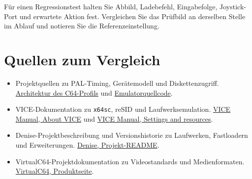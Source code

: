 \documentclass[fontsize=10.2bp,DIV=calc,oneside,open=any,headings=normal,numbers=noenddot]{scrbook}
\begin{document}
Für einen Regressionstest halten Sie Abbild, Ladebefehl, Eingabefolge,
Joystick-Port und erwartete Aktion fest. Vergleichen Sie das Prüfbild
an derselben Stelle im Ablauf und notieren Sie die Referenzeinstellung.

\section{Quellen zum Vergleich}\label{sec:comparison-sources}
\begin{itemize}
  \item Projektquellen zu PAL-Timing, Gerätemodell und Diskettenzugriff.
    \href{https://github.com/rudolfstepan/6502-sbc-emulator/blob/d86f6b0/docs/ARCHITECTURE.md#c64-profile}{Architektur des C64-Profils}
    und
    \href{https://github.com/rudolfstepan/6502-sbc-emulator/tree/d86f6b0/src}{Emulatorquellcode}.
  \item VICE-Dokumentation zu \texttt{x64sc}, reSID und
    Laufwerksemulation.
    \href{https://vice-emu.sourceforge.io/vice_1.html}{VICE Manual, About VICE}
    und
    \href{https://vice-emu.sourceforge.io/vice_6.html}{VICE Manual, Settings and resources}.
  \item Denise-Projektbeschreibung und Versionshistorie zu
    Laufwerken, Fastloadern und Erweiterungen.
    \href{https://github.com/piciji/denise}{Denise, Projekt-README}.
  \item VirtualC64-Projektdokumentation zu Videostandards und
    Medienformaten.
    \href{https://dirkwhoffmann.github.io/VirtualC64/index.html}{VirtualC64, Produktseite}.
\end{itemize}
\end{document}

